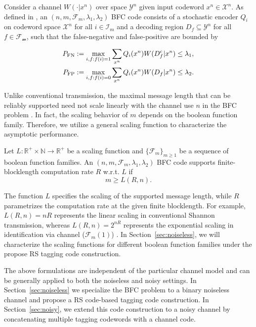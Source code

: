 Consider a channel $W(\cdot|x^n)$ over space $\mathcal{Y}^n$ given input codeword $x^n\in\mathcal{X}^n$.
As defined in \cite{BFC}, an $(n,m,\mathcal{F}_m,\lambda_1,\lambda_2)$ BFC code consists of a stochastic encoder $Q_i$ on codeword space $\mathcal{X}^n$ for all $i\in\mathcal{I}_m$ and a decoding region $D_f\subseteq \mathcal{Y}^n$ for all $f\in \mathcal{F_m}$, such that the false-negative and false-positive are bounded by

\begin{align}
    P_{\rm FN}:=\max_{\substack{i,f:f(i)=1}}
    \sum_{x^n}Q_i(x^n)W(D_f^{\mathrm{c}}|x^n)
    &\leq \lambda_1, \label{equ:BFC_FN}\\
    P_{\rm FP}:=\max_{\substack{i,f:f(i)=0}}
    \sum_{x^n}Q_i(x^n)W(D_f|x^n)
    &\leq \lambda_2. \label{equ:BFC_FP}
\end{align}



Unlike conventional transmission, the maximal message length that can be reliably supported need not scale linearly with the channel use $n$ in the BFC problem \cite{BFC}. In fact, the scaling behavior of $m$ depends on the boolean function family. Therefore, we utilize a general scaling function to characterize the asymptotic performance.
\begin{definition}
\label{def:achievable}
Let $L:\mathbb{R}^{+}\times\mathbb{N}\to\mathbb{R}^{+}$
be a scaling function and $\{\mathcal{F}_m\}_{m\geq 1}$ be a sequence of boolean function families. An $(n,m,\mathcal{F}_m,\lambda_1,\lambda_2)$ BFC code supports finite-blocklength computation rate $R$ w.r.t. $L$ if
\begin{equation}
    \label{equ:finite_rate}
    m \geq L(R,n).
\end{equation}
\end{definition}
The function $L$ specifies the scaling of the supported message length, while $R$ parametrizes the computation rate at the given finite blocklength.
For example, $L(R,n)=nR$ represents the linear scaling in conventional Shannon transmission, whereas $L(R,n) = 2^{nR}$ represents the exponential scaling in identification via channel ($\mathcal{F}_m(1)$) \cite{ID}.
In Section~\ref{sec:noiseless}, we will characterize the scaling functions for different boolean function families under the propose RS tagging code construction.

The above formulations are independent of the particular channel model and can be generally applied to both the noiseless and noisy settings. In Section~\ref{sec:noiseless} we specialize the BFC problem to a binary noiseless channel and propose a RS code-based tagging code construction. In Section~\ref{sec:noisy}, we extend this code construction to a noisy channel by concatenating multiple tagging codewords with a channel code.

